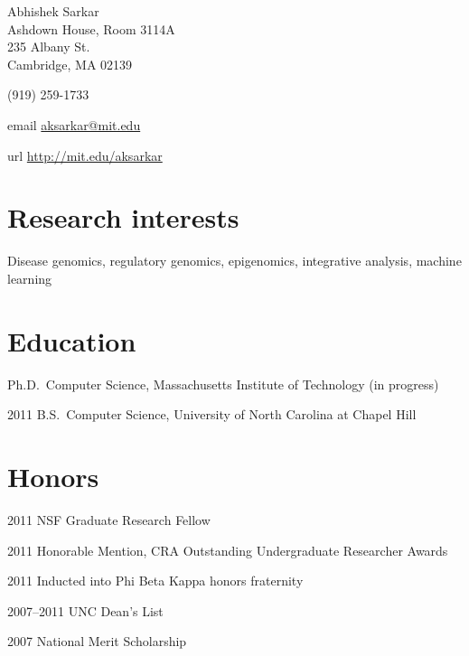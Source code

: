 \documentclass{article}
\begin{document}
{\LARGE Abhishek Sarkar\vspace{1em}}\\
Ashdown House, Room 3114A\\
235 Albany St.\\
Cambridge, MA 02139\vspace{1em}

(919) 259-1733\vspace{1em}

\begin{hdesc}
\item[email] \url{aksarkar@mit.edu}
\item[url] \url{http://mit.edu/aksarkar}
\end{hdesc}

\section*{Research interests}
Disease genomics, regulatory genomics, epigenomics, integrative analysis,
machine learning

\section*{Education}
\begin{hdesc}
\item[] Ph.D.\ Computer Science, Massachusetts Institute of Technology (in
  progress)
\item[2011] B.S.\ Computer Science, University of North Carolina at
  Chapel Hill
\end{hdesc}

\section*{Honors}
\begin{hdesc}
\item[2011] NSF Graduate Research Fellow
\item[2011] Honorable Mention, CRA Outstanding Undergraduate Researcher Awards
\item[2011] Inducted into Phi Beta Kappa honors fraternity
\item[2007--2011] UNC Dean's List
\item[2007] National Merit Scholarship
\end{hdesc}
\end{document}
